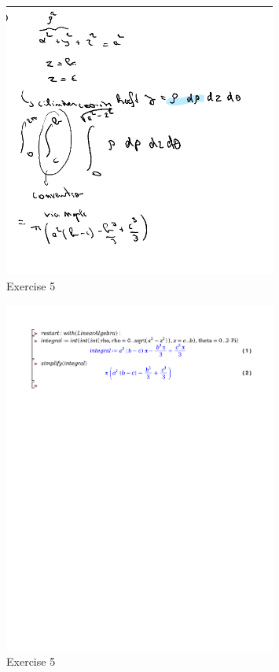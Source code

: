 \documentclass[a4paper]{report}
\begin{document}
\begin{figure}[H]
	\centering
	\includegraphics[width=0.8\textwidth]{assets/huis_5_ex_5.png}
	\caption{Exercise 5}
	\label{fig:huis_5_ex_5}
\end{figure}

\begin{figure}[H]
	\centering
	\includegraphics[width=0.8\textwidth]{exercises/huis_5_ex_5.pdf}
	\caption{Exercise 5}
	\label{fig:huis_5_ex_5_maple}
\end{figure}
\end{document}
